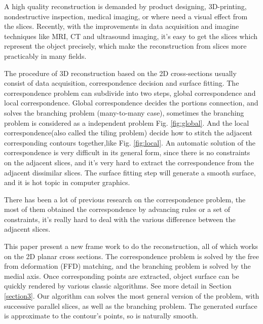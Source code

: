 \documentclass[3p,times]{elsarticle}
\begin{document}
A high quality reconstruction is demanded by product designing, 3D-printing,
nondestructive inspection, medical imaging, or where need a visual
effect from the slices. Recently, with the improvements in data
acquisition and imagine techniques like MRI, CT and ultrasound
imaging, it's easy to get the slices which represent the object
precisely, which make the reconstruction from slices more practicably
 in many fields.

The procedure of 3D reconstruction based on the 2D cross-sections
usually consist of data acquisition, correspondence decision and
surface fitting. The correspondence problem can subdivide into two steps,
global correspondence and local correspondence. Global correspondence
decides the portions connection, and solves the branching
problem (many-to-many case), sometimes the branching problem is
considered as a independent problem Fig. \ref{fig:global}. And the local
correspondence(also called the tiling problem) decide how
to stitch the adjacent corresponding contours together,like
Fig. \ref{fig:local}. An automatic solution of the correspondence is
very difficult in its general form, since there is no constraints on
the adjacent slices, and it's very hard to extract the correspondence
from the adjacent dissimilar slices. The surface fitting step will
generate a smooth surface, and it is hot topic in computer
graphics.

There has been a lot of previous research on the correspondence
problem, the most of them obtained the correspondence by advancing
rules or a set of constraints, it's really hard to deal with the
various difference between the adjacent slices.

This paper present a new frame work to do the reconstruction, all of which
works on the 2D planar cross sections. The correspondence problem is
solved by the free from deformation (FFD) matching, and the branching
problem is solved by the medial axis. Once corresponding points are
extracted, object surface can be quickly rendered by various classic algorithms. See more detail in Section \ref{section3}.
Our algorithm can solves the most general version of the problem, with
successive parallel slices, as well as the branching problem. The generated
surface is approximate to the contour's points, so is naturally
smooth.
\end{document}
